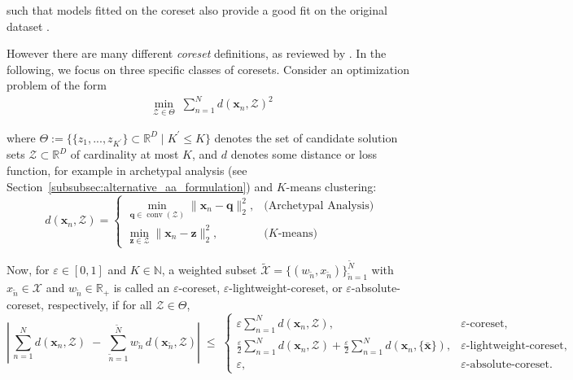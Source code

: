 \documentclass[oneside]{article}
\begin{document}
such that models fitted on the coreset also provide a good fit on the original dataset \autocite{feldmanIntroductionCoresetsUpdated2020}.

However there are many different \emph{coreset} definitions, as reviewed by \textcite{feldmanIntroductionCoresetsUpdated2020}. In the following, we focus on three specific classes of coresets. Consider an optimization problem of the form
\begin{equation}
    \begin{aligned}
        \underset{\mathcal{Z} \in \Theta}{\min} \; \sum_{n=1}^N d(\mathbf{x}_n, \mathcal{Z})^2
    \end{aligned}
\end{equation}

where $\Theta := \{ \{z_1, ..., z_{K^\prime}\} \subset \mathbb{R}^D \mid K^\prime \leq K\}$ denotes the set of candidate solution sets $\mathcal{Z} \subset \mathbb{R}^D$ of cardinality at most $K$, and $d$ denotes some distance or loss function, for example in archetypal analysis (see Section~\ref{subsubsec:alternative_aa_formulation}) and $K$-means clustering:
\begin{equation}
    \label{eq:distances}
    d(\mathbf{x}_n, \mathcal{Z})
    =
    \begin{cases}
        \displaystyle
        \min_{\mathbf{q}\in\operatorname{conv}(\mathcal{Z})}\| \mathbf{x}_n - \mathbf{q}\|_2^2,
        &\text{(Archetypal Analysis)} \\
        \displaystyle
        \min_{\mathbf{z} \in\mathcal{Z}}\| \mathbf{x}_n - \mathbf{z} \|_2^2,
        &\text{($K$-means)}
    \end{cases}
\end{equation}

Now, for $\varepsilon \in [0, 1]$ and $K \in \mathbb{N}$, a weighted subset $\tilde{\mathcal{X}} = \{(w_{\tilde{n}}, x_{\tilde{n}})\}_{\tilde{n}=1}^{\tilde{N}}$ with $x_{\tilde{n}} \in \mathcal{X}$ and $w_{\tilde{n}} \in \mathbb{R}_+$ is called an $\varepsilon$-coreset, $\varepsilon$-lightweight-coreset, or $\varepsilon$-absolute-coreset, respectively, if for all $\mathcal{Z} \in \Theta$,
\begin{equation}
    \label{eq:coreset-cases}
    \left|\,
        \sum_{n=1}^N d(\mathbf{x}_n,\mathcal{Z})
        \;-\;
        \sum_{\tilde n=1}^{\tilde N} w_{\tilde n} \, d(\mathbf{x}_{\tilde n},\mathcal{Z})
    \right|
    \;\le\;
    \begin{cases}
        \varepsilon \sum_{n=1}^N d(\mathbf{x}_n,\mathcal{Z}),
        & \varepsilon\text{-coreset},\\
        \frac{\varepsilon}{2} \sum_{n=1}^N d(\mathbf{x}_n, \mathcal{Z}) + \frac{\varepsilon}{2} \sum_{n=1}^N d(\mathbf{x}_n, \{ \bar{\mathbf{x}} \}),
        & \varepsilon\text{-lightweight-coreset},\\
        \varepsilon,
        & \varepsilon\text{-absolute-coreset}.
    \end{cases}
\end{equation}
\end{document}

